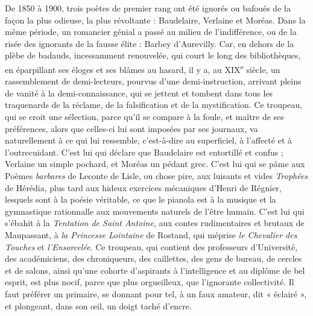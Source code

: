 \documentclass[french,twoside]{book} %
\begin{document}
De 1850 à 1900, trois poètes de premier rang ont été ignorés ou bafoués de la façon la plus odieuse, la plus révoltante : Baudelaire, Verlaine et Moréas. Dans la même période, un romancier génial a passé au milieu de l’indifférence, ou de la risée des ignorants de la fausse élite : Barbey d’Aurevilly. Car, en dehors de la plèbe de badauds, incessamment renouvelée, qui court le long des bibliothèques, en éparpillant ses éloges et ses blâmes au hasard, il y a, au XIX\textsuperscript{e} siècle, un rassemblement de demi-lecteurs, pourvus d’une demi-instruction, arrivant pleins de vanité à la demi-connaissance, qui se jettent et tombent dans tous les traquenards de la réclame, de la falsification et de la mystification. Ce troupeau, qui se croit une sélection, parce qu’il se compare à la foule, et maître de ses préférences, alors que celles-ci lui sont imposées par ses journaux, va naturellement à ce qui lui ressemble, c’est-à-dire au superficiel, à l’affecté et à l’outrecuidant. C’est lui qui déclare que Baudelaire est entortillé et confus ; Verlaine un simple pochard, et Moréas un pédant grec. C’est lui qui se pâme aux Poèmes {\itshape barbares} de Leconte de Lisle, ou chose pire, aux luisants et vides {\itshape Trophées} de Hérédia, plus tard aux hideux exercices mécaniques d’Henri de Régnier, lesquels sont à la poésie véritable, ce que le pianola est à la musique et la gymnastique rationnalle aux mouvements naturels de l’être humain. C’est lui qui s’ébahit à la {\itshape Tentation de Saint Antoine}, aux contes rudimentaires et brutaux de Maupassant, à {\itshape la Princesse Lointaine} de Rostand, qui méprise {\itshape le Chevalier des Touches} et {\itshape l’Ensorcelée}. Ce troupeau, qui contient des professeurs d’Université, des académiciens, des chroniqueurs, des caillettes, des gens de bureau, de cercles et de salons, ainsi qu’une cohorte d’aspirants à l’intelligence et au diplôme de bel esprit, est plus nocif, parce que plus orgueilleux, que l’ignorante collectivité. Il faut préférer un primaire, se donnant pour tel, à un faux amateur, dit « éclairé », et plongeant, dans son œil, un doigt taché d’encre.\par
\end{document}
